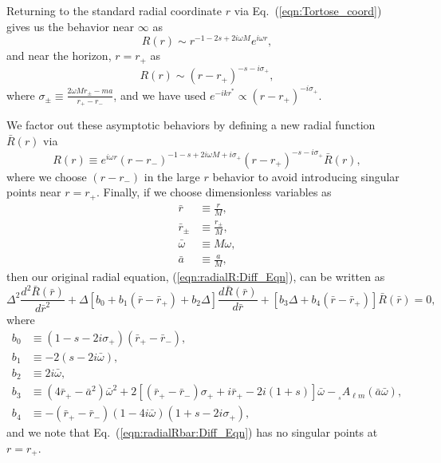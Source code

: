 \documentclass[11pt]{article}
\newcommand{\scA}[4][]{{}_{{}_{#2}}A^{#1}_{#3}(#4)}
\begin{document}
Returning to the standard radial coordinate $r$ via
Eq.~(\ref{eqn:Tortose_coord}) gives us the behavior near $\infty$ as
\begin{equation}
  R(r) \sim r^{-1-2s+2i\omega{M}}e^{i\omega{r}}, 
\end{equation}
and near the horizon, $r=r_+$ as
\begin{equation}
  R(r) \sim (r - r_+)^{-s-i\sigma_+}, 
\end{equation}
where $\sigma_\pm\equiv\frac{2\omega{M}r_\pm - ma}{r_+-r_\minus}$, and we
have used $e^{-ik{r^*}} \propto (r-r_+)^{-i\sigma_+}$.

We factor out these asymptotic behaviors by defining a new radial 
function $\bar{R}(r)$ via
\begin{equation}
  R(r) \equiv e^{i\omega{r}} (r-r_\minus)^{-1-s+2i\omega{M}+i\sigma_+} 
        (r - r_+)^{-s-i\sigma_+} \bar{R}(r),
\end{equation}
where we choose $(r-r_\minus)$ in the large $r$ behavior to avoid
introducing singular points near $r=r_+$.
Finally, if we choose dimensionless variables as
\begin{align}
  \bar{r} &\equiv \frac{r}{M}, \\
  \bar{r}_\pm &\equiv \frac{r_\pm}{M}, \\
  \bar\omega &\equiv M\omega, \\
  \bar{a} &\equiv \frac{a}{M},
\end{align}
then our original radial equation, (\ref{eqn:radialR:Diff_Eqn}), can 
be written as
\begin{equation}\label{eqn:radialRbar:Diff_Eqn}
  \Delta^2\frac{d^2\bar{R}(\bar{r})}{d\bar{r}^2}
  + \Delta[b_0 + b_1(\bar{r}-\bar{r}_+) + b_2\Delta]
            \frac{d\bar{R}(\bar{r})}{d\bar{r}}
  + [b_3\Delta + b_4(\bar{r}-\bar{r}_+)]\bar{R}(\bar{r}) = 0,
\end{equation}
where
\begin{align}
  b_0 &\equiv (1-s-2i\sigma_+)(\bar{r}_+-\bar{r}_\minus), \\
  b_1 &\equiv -2(s-2i\bar\omega), \\
  b_2 &\equiv 2i\bar\omega, \\
  b_3 &\equiv (4\bar{r}_+-\bar{a}^2)\bar\omega^2
              + 2[(\bar{r}_+-\bar{r}_\minus)\sigma_+ + i\bar{r}_+ 
                  - 2i(1+s)]\bar\omega - \scA{s}{\ell{m}}{\bar{a}\bar\omega}, \\
  b_4 &\equiv -(\bar{r}_+-\bar{r}_\minus)(1-4i\bar\omega)(1+s-2i\sigma_+),
\end{align}
and we note that Eq.~(\ref{eqn:radialRbar:Diff_Eqn}) has no singular
points at $r=r_+$.
\end{document}
